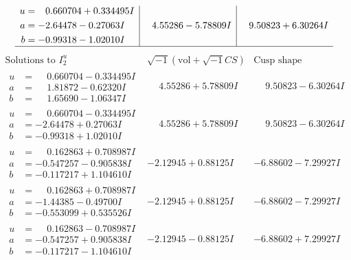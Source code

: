 \documentclass[1p]{elsarticle_modified}
\theoremstyle{definition}
\newcommand{\I}{\sqrt{-1}}
\begin{document}
$$\begin{array}{c|c|c}
\begin{aligned}
u &= \phantom{-}0.660704 + 0.334495 I \\
a &= -2.64478 - 0.27063 I \\
b &= -0.99318 - 1.02010 I\end{aligned}
 & \phantom{-}4.55286 - 5.78809 I & \phantom{-}9.50823 + 6.30264 I\\
 \hline 
 \end{array}$$\newpage$$\begin{array}{c|c|c}  
\text{Solutions to }I^u_{2}& \I (\text{vol} + \sqrt{-1}CS) & \text{Cusp shape}\\
 \hline 
\begin{aligned}
u &= \phantom{-}0.660704 - 0.334495 I \\
a &= \phantom{-}1.81872 - 0.62320 I \\
b &= \phantom{-}1.65690 - 1.06347 I\end{aligned}
 & \phantom{-}4.55286 + 5.78809 I & \phantom{-}9.50823 - 6.30264 I \\ \hline\begin{aligned}
u &= \phantom{-}0.660704 - 0.334495 I \\
a &= -2.64478 + 0.27063 I \\
b &= -0.99318 + 1.02010 I\end{aligned}
 & \phantom{-}4.55286 + 5.78809 I & \phantom{-}9.50823 - 6.30264 I \\ \hline\begin{aligned}
u &= \phantom{-}0.162863 + 0.708987 I \\
a &= -0.547257 - 0.905838 I \\
b &= -0.117217 + 1.104610 I\end{aligned}
 & -2.12945 + 0.88125 I & -6.88602 - 7.29927 I \\ \hline\begin{aligned}
u &= \phantom{-}0.162863 + 0.708987 I \\
a &= -1.44385 - 0.49700 I \\
b &= -0.553099 + 0.535526 I\end{aligned}
 & -2.12945 + 0.88125 I & -6.88602 - 7.29927 I \\ \hline\begin{aligned}
u &= \phantom{-}0.162863 - 0.708987 I \\
a &= -0.547257 + 0.905838 I \\
b &= -0.117217 - 1.104610 I\end{aligned}
 & -2.12945 - 0.88125 I & -6.88602 + 7.29927 I \\ \hline\begin{aligned}

\end{aligned}
\end{array}$$
\end{document}
